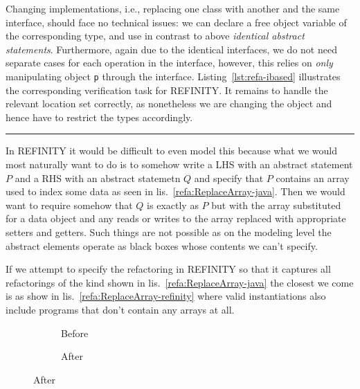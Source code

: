 Changing implementations, i.e., replacing one class with another and the same interface,
should face no technical issues: we can declare a free object variable of the corresponding type,
and use in contrast to above \textit{identical abstract statements}.
Furthermore, again due to the identical interfaces, we do not need separate cases for each operation in the interface,
however, this relies on \textit{only} manipulating object \texttt{p} through the interface.
Listing~\ref{lst:refa-ibased} illustrates the corresponding verification task for REFINITY.
It remains to handle the relevant location set correctly, as nonetheless we are changing the object and hence have to restrict the types accordingly.


\noindent\rule{\textwidth}{2pt}


In REFINITY it would be difficult to even model this because what we would most naturally want to do is to somehow write a LHS with an abstract statement $P$ and a RHS with an abstract statemetn $Q$ and specify that $P$ contains an array used to index some data as seen in lis.~\ref{refa:ReplaceArray-java}. Then we would want to require somehow that $Q$ is exactly as $P$ but with the array substituted for a data object and any reads or writes to the array replaced with appropriate setters and getters. Such things are not possible as on the modeling level the abstract elements operate as black boxes whose contents we can't specify.

If we attempt to specify the refactoring in REFINITY so that it captures all refactorings of the kind shown in lis.~\ref{refa:ReplaceArray-java} the closest we come is as show in lis.~\ref{refa:ReplaceArray-refinity} where valid instantiations
also include programs that don't contain any arrays at all.

\begin{figure}
  \begin{subfigure}[h]{.45\linewidth} 
    
    \caption{Before}
    \label{refa:ReplaceArray-refinity-before}   
  \end{subfigure}\hspace{1cm}
  \begin{subfigure}[h]{.45\linewidth}
    
    \caption{After}
    \label{refa:ReplaceArray-refinity--after}
  \end{subfigure}
  \label{lst:ReplaceArray-refinity}
\end{figure}

